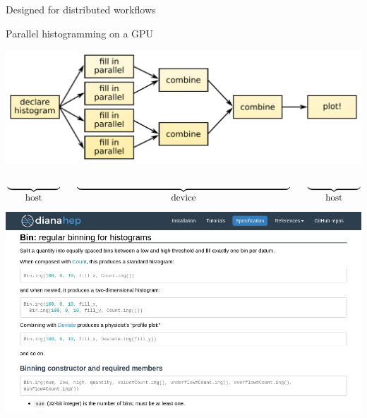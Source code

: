 \documentclass[aspectratio=169]{beamer}
\begin{document}
\begin{frame}{Designed for distributed workflows}
\vspace{0.5 cm}
\begin{block}{Parallel histogramming on a GPU}
\end{block}

\includegraphics[width=\linewidth]{parallelization.pdf}

\vspace{-1 cm}
\[ \underbrace{\mbox{\hspace{2 cm}}}_{\mbox{host}} \hspace{0.6 cm} \underbrace{\mbox{\hspace{8.125 cm}}}_{\mbox{device}} \hspace{0.625 cm} \underbrace{\mbox{\hspace{2 cm}}}_{\mbox{host}} \]

\end{frame}

\begin{frame}{}
\hspace{-1 cm}\mbox{\includegraphics[width=16 cm]{spec1.png}\hspace{-5 cm}}

\vspace{-6.7 cm}
\hfill {} \hspace{-1 cm}
\vspace{6.7 cm}
\end{frame}
\end{document}
